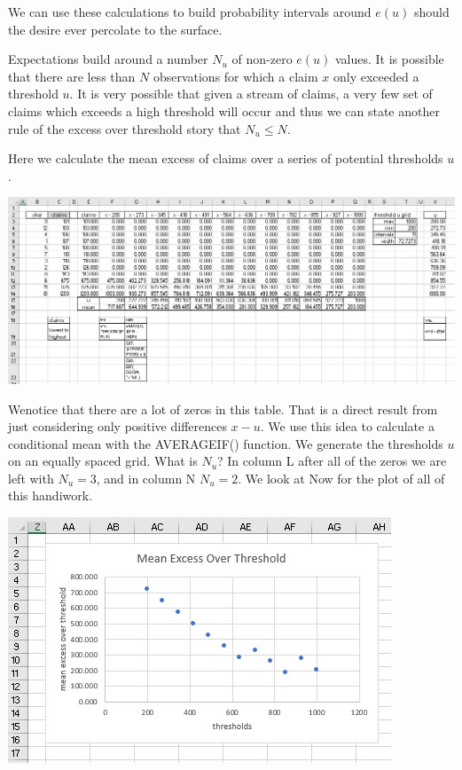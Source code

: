 \documentclass[
]{book}
\begin{document}
We can use these calculations to build probability intervals around \(e(u)\) should the desire ever percolate to the surface.

Expectations build around a number \(N_u\) of non-zero \(e(u)\) values. It is possible that there are less than \(N\) observations for which a claim \(x\) only exceeded a threshold \(u\). It is very possible that given a stream of claims, a very few set of claims which exceeds a high threshold will occur and thus we can state another rule of the excess over threshold story that \(N_u \leq N\).

Here we calculate the mean excess of claims over a series of potential thresholds \(u\).

\includegraphics{images/06/claims-mep-calculation.jpg}

Wenotice that there are a lot of zeros in this table. That is a direct result from just considering only positive differences \(x-u\). We use this idea to calculate a conditional mean with the AVERAGEIF() function. We generate the thresholds \(u\) on an equally spaced grid. What is \(N_u\)? In column L after all of the zeros we are left with \(N_u=3\), and in column N \(N_u=2\). We look at Now for the plot of all of this handiwork.

\includegraphics{images/06/claims-mep-plot.jpg}
\end{document}
